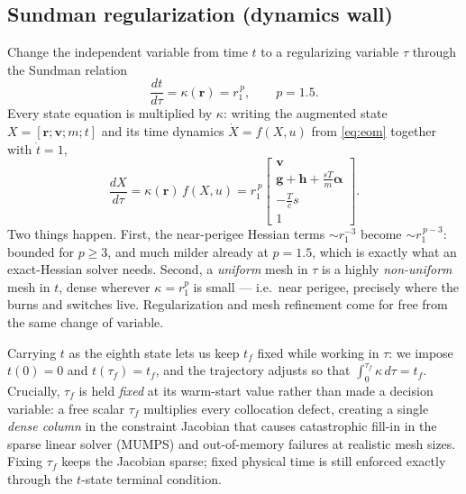 \documentclass[11pt]{article}
\newcommand{\vv}[1]{\boldsymbol{#1}}
\newcommand{\rvec}{\vv{r}}
\newcommand{\vvec}{\vv{v}}
\newcommand{\dtau}{\,d\tau}
\begin{document}
\subsection{Sundman regularization (dynamics wall)}
Change the independent variable from time $t$ to a regularizing variable $\tau$
through the Sundman relation
\begin{equation}
\frac{dt}{d\tau}=\kappa(\rvec)=r_1^{\,p},\qquad p=1.5 .
\label{eq:sundman}
\end{equation}
Every state equation is multiplied by $\kappa$: writing the augmented state
$X=[\rvec;\vvec;m;t]$ and its time dynamics $\dot X=f(X,u)$ from
\eqref{eq:eom} together with $\dot t=1$,
\begin{equation}
\frac{dX}{d\tau}=\kappa(\rvec)\,f(X,u)
=r_1^{\,p}\begin{bmatrix}\vvec\\[2pt]\vv g+\vv h+\tfrac{sT}{m}\vv\alpha\\[2pt]
-\tfrac{T}{c}s\\[2pt]1\end{bmatrix}.
\label{eq:sundmandyn}
\end{equation}
Two things happen. First, the near-perigee Hessian terms
$\sim r_1^{-3}$ become $\sim r_1^{\,p-3}$: bounded for $p\ge3$, and much
milder already at $p=1.5$, which is exactly what an exact-Hessian solver needs.
Second, a \emph{uniform} mesh in $\tau$ is a highly \emph{non-uniform} mesh in
$t$, dense wherever $\kappa=r_1^p$ is small --- i.e.\ near perigee, precisely
where the burns and switches live. Regularization and mesh refinement come for
free from the same change of variable.

Carrying $t$ as the eighth state lets us keep $t_f$ fixed while working in
$\tau$: we impose $t(0)=0$ and $t(\tau_f)=t_f$, and the trajectory adjusts so
that $\int_0^{\tau_f}\kappa\dtau=t_f$. Crucially, $\tau_f$ is held
\emph{fixed} at its warm-start value rather than made a decision variable: a
free scalar $\tau_f$ multiplies every collocation defect, creating a single
\emph{dense column} in the constraint Jacobian that causes catastrophic
fill-in in the sparse linear solver (MUMPS) and out-of-memory failures at
realistic mesh sizes. Fixing $\tau_f$ keeps the Jacobian sparse; fixed
physical time is still enforced exactly through the $t$-state terminal
condition.
\end{document}
